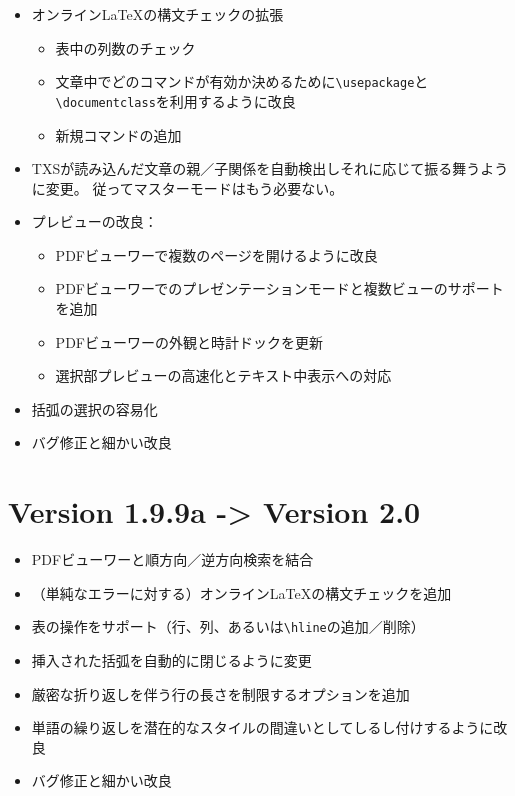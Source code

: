 \begin{itemize}
\item
  オンラインLaTeXの構文チェックの拡張

  \begin{itemize}
  \item
    表中の列数のチェック
  \item
    文章中でどのコマンドが有効か決めるために\verb+\usepackage+と
    \verb+\documentclass+を利用するように改良
  \item
    新規コマンドの追加
  \end{itemize}
\item
  TXSが読み込んだ文章の親／子関係を自動検出しそれに応じて振る舞うように変更。
  従ってマスターモードはもう必要ない。
\item
  プレビューの改良：

  \begin{itemize}
  \item
    PDFビューワーで複数のページを開けるように改良
  \item
    PDFビューワーでのプレゼンテーションモードと複数ビューのサポートを追加
  \item
    PDFビューワーの外観と時計ドックを更新
  \item
    選択部プレビューの高速化とテキスト中表示への対応
  \end{itemize}
\item
  括弧の選択の容易化
\item
  バグ修正と細かい改良
\end{itemize}

\section{Version 1.9.9a -\textgreater{} Version 2.0}

\begin{itemize}
\item
  PDFビューワーと順方向／逆方向検索を結合
\item
  （単純なエラーに対する）オンラインLaTeXの構文チェックを追加
\item
  表の操作をサポート（行、列、あるいは\verb+\hline+の追加／削除）
\item
  挿入された括弧を自動的に閉じるように変更
\item
  厳密な折り返しを伴う行の長さを制限するオプションを追加
\item
  単語の繰り返しを潜在的なスタイルの間違いとしてしるし付けするように改良
\item
  バグ修正と細かい改良
\end{itemize}

